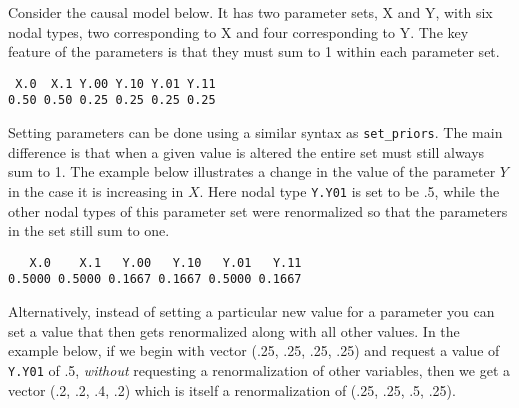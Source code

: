 \documentclass[
  12pt,
]{book}
\newenvironment{Shaded}{\begin{snugshade}}{\end{snugshade}}
\newcommand{\DataTypeTok}[1]{\textcolor[rgb]{0.13,0.29,0.53}{#1}}
\newcommand{\FloatTok}[1]{\textcolor[rgb]{0.00,0.00,0.81}{#1}}
\newcommand{\KeywordTok}[1]{\textcolor[rgb]{0.13,0.29,0.53}{\textbf{#1}}}
\newcommand{\NormalTok}[1]{#1}
\newcommand{\OperatorTok}[1]{\textcolor[rgb]{0.81,0.36,0.00}{\textbf{#1}}}
\newcommand{\StringTok}[1]{\textcolor[rgb]{0.31,0.60,0.02}{#1}}
\begin{document}
Consider the causal model below. It has two parameter sets, X and Y, with six nodal types, two corresponding to X and four corresponding to Y. The key feature of the parameters is that they must sum to 1 within each parameter set.

\begin{Shaded}
\end{Shaded}

\begin{verbatim}
 X.0  X.1 Y.00 Y.10 Y.01 Y.11 
0.50 0.50 0.25 0.25 0.25 0.25 
\end{verbatim}

Setting parameters can be done using a similar syntax as \texttt{set\_priors}. The main difference is that when a given value is altered the entire set must still always sum to 1. The example below illustrates a change in the value of the parameter \(Y\) in the case it is increasing in \(X\). Here nodal type \texttt{Y.Y01} is set to be .5, while the other nodal types of this parameter set were renormalized so that the parameters in the set still sum to one.

\begin{Shaded}
\end{Shaded}

\begin{verbatim}
   X.0    X.1   Y.00   Y.10   Y.01   Y.11 
0.5000 0.5000 0.1667 0.1667 0.5000 0.1667 
\end{verbatim}

Alternatively, instead of setting a particular new value for a parameter you can set a value that then gets renormalized along with all other values. In the example below, if we begin with vector (.25, .25, .25, .25) and request a value of \texttt{Y.Y01} of .5, \emph{without} requesting a renormalization of other variables, then we get a vector (.2, .2, .4, .2) which is itself a renormalization of (.25, .25, .5, .25).
\end{document}
